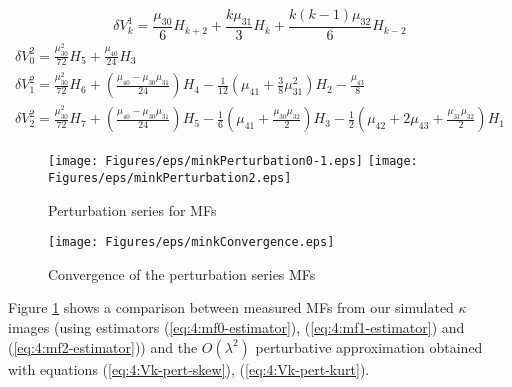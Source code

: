 \begin{equation}
\label{eq:4:Vk-pert-skew}
\delta V^1_k = \frac{\mu_{30}}{6}H_{k+2} + \frac{k\mu_{31}}{3}H_k + \frac{k(k-1)\mu_{32}}{6}H_{k-2}
\end{equation}
%
\begin{equation}
\label{eq:4:Vk-pert-kurt}
\begin{gathered}
\displaystyle \delta V^2_0 = \frac{\mu_{30}^2}{72}H_5 + \frac{\mu_{40}}{24}H_3 \\
\displaystyle \delta V^2_1 = \frac{\mu_{30}^2}{72}H_6 + \left(\frac{\mu_{40}-\mu_{30}\mu_{31}}{24}\right)H_4 - \frac{1}{12}\left(\mu_{41}+\frac{3}{8}\mu_{31}^2\right)H_2 - \frac{\mu_{43}}{8}  \\ 
\displaystyle \delta V^2_2 = \frac{\mu_{30}^2}{72}H_7 + \left(\frac{\mu_{40}-\mu_{30}\mu_{31}}{24}\right)H_5 - \frac{1}{6}\left(\mu_{41}+\frac{\mu_{30}\mu_{32}}{2}\right)H_3 - \frac{1}{2}\left(\mu_{42}+2\mu_{43}+\frac{\mu_{31}\mu_{32}}{2}\right)H_1 
\end{gathered}
\end{equation}
%
\begin{figure}
\begin{center}
\texttt{[image: Figures/eps/minkPerturbation0-1.eps]}
\texttt{[image: Figures/eps/minkPerturbation2.eps]}
\end{center}
\caption{Perturbation series for MFs}
\label{fig:4:minkpert}
\end{figure}
%
\begin{figure}
\begin{center}
\texttt{[image: Figures/eps/minkConvergence.eps]}
\end{center}
\caption{Convergence of the perturbation series MFs}
\label{fig:4:minkconv}
\end{figure}
%
Figure \ref{fig:4:minkpert} shows a comparison between measured MFs from our simulated $\kappa$ images (using estimators (\ref{eq:4:mf0-estimator}), (\ref{eq:4:mf1-estimator}) and (\ref{eq:4:mf2-estimator})) and the $O(\lambda^2)$ perturbative approximation obtained with equations (\ref{eq:4:Vk-pert-skew}), (\ref{eq:4:Vk-pert-kurt}).  


